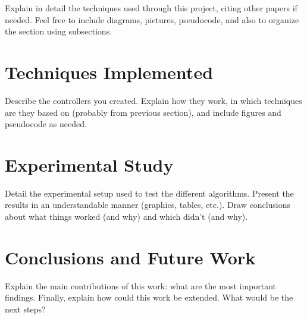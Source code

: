 \documentclass{llncs}
\begin{document}
Explain in detail the techniques used through this project, citing other papers if needed. Feel free to include diagrams, pictures, pseudocode, and also to organize the section using subsections.



\section{Techniques Implemented} \label{sec:exp}

Describe the controllers you created. Explain how they work, in which techniques are they based on (probably from previous section), and include figures and pseudocode as needed.

\section{Experimental Study} \label{sec:exp}

Detail the experimental setup used to test the different algorithms. Present the results in an understandable manner (graphics, tables, etc.). Draw conclusions about what things worked (and why) and which didn't (and why). 

\section{Conclusions and Future Work} \label{sec:conc}

Explain the main contributions of this work: what are the most important findings. Finally, explain how could this work be extended. What would be the next steps?




\end{document}
